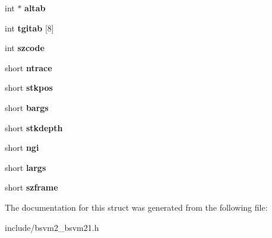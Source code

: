 \begin{DoxyCompactItemize}
\item 
\hypertarget{structBSVM2__CodeBlock__s_a688f110102c34292d81e89ef95ae1cd8}{int $\ast$ {\bfseries altab}}\label{structBSVM2__CodeBlock__s_a688f110102c34292d81e89ef95ae1cd8}

\item 
\hypertarget{structBSVM2__CodeBlock__s_a44deac1f9d734a98fe1753c9fe35496c}{int {\bfseries tgitab} \mbox{[}8\mbox{]}}\label{structBSVM2__CodeBlock__s_a44deac1f9d734a98fe1753c9fe35496c}

\item 
\hypertarget{structBSVM2__CodeBlock__s_ab2dc702f995d3b45d532e681576033ef}{int {\bfseries szcode}}\label{structBSVM2__CodeBlock__s_ab2dc702f995d3b45d532e681576033ef}

\item 
\hypertarget{structBSVM2__CodeBlock__s_a94993040eb916c1b776d5656ad6bc8f1}{short {\bfseries ntrace}}\label{structBSVM2__CodeBlock__s_a94993040eb916c1b776d5656ad6bc8f1}

\item 
\hypertarget{structBSVM2__CodeBlock__s_a1605ec8982b43fcda99046f4870000b3}{short {\bfseries stkpos}}\label{structBSVM2__CodeBlock__s_a1605ec8982b43fcda99046f4870000b3}

\item 
\hypertarget{structBSVM2__CodeBlock__s_a025520eb062a19b66c626be01cd46d89}{short {\bfseries bargs}}\label{structBSVM2__CodeBlock__s_a025520eb062a19b66c626be01cd46d89}

\item 
\hypertarget{structBSVM2__CodeBlock__s_a5b3949ea71f36ef4013094b40aab907a}{short {\bfseries stkdepth}}\label{structBSVM2__CodeBlock__s_a5b3949ea71f36ef4013094b40aab907a}

\item 
\hypertarget{structBSVM2__CodeBlock__s_a8c22b210aaec953137ef520c4140d26e}{short {\bfseries ngi}}\label{structBSVM2__CodeBlock__s_a8c22b210aaec953137ef520c4140d26e}

\item 
\hypertarget{structBSVM2__CodeBlock__s_a03ffc17b9d4ef3eb82d611662573a2e9}{short {\bfseries largs}}\label{structBSVM2__CodeBlock__s_a03ffc17b9d4ef3eb82d611662573a2e9}

\item 
\hypertarget{structBSVM2__CodeBlock__s_a9943d2d56fc4d3ef860188f5f0c4f53e}{short {\bfseries szframe}}\label{structBSVM2__CodeBlock__s_a9943d2d56fc4d3ef860188f5f0c4f53e}

\end{DoxyCompactItemize}


The documentation for this struct was generated from the following file\-:\begin{DoxyCompactItemize}
\item 
include/bsvm2\-\_\-bsvm21.\-h\end{DoxyCompactItemize}
